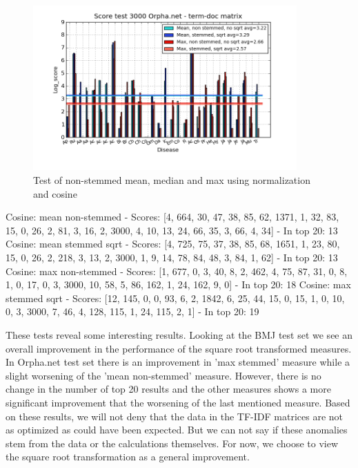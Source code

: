 \begin{figure}[h!]
        \begin{center}
          \includegraphics[width=0.9\textwidth]{barcharts/termDoc_orphan_hist_3000_ns_mea_ns_mea_sqr_s_max_s_max_sqr.png}
        \end{center}
        \caption{Test of non-stemmed mean, median and max using normalization and cosine}
        \label{termDoc_orphan_hist_3000_ns_mea_ns_mea_sqr_s_max_s_max_sqr}
\end{figure}

 
Cosine: mean non-stemmed - Scores: [4, 664, 30, 47, 38, 85, 62, 1371, 1, 32, 83, 15, 0, 26, 2, 81, 3, 16, 2, 3000, 4, 10, 13, 24, 66, 35, 3, 66, 4, 34] - In top 20: 13
Cosine: mean stemmed sqrt - Scores: [4, 725, 75, 37, 38, 85, 68, 1651, 1, 23, 80, 15, 0, 26, 2, 218, 3, 13, 2, 3000, 1, 9, 14, 78, 84, 48, 3, 84, 1, 62] - In top 20: 13
Cosine: max non-stemmed - Scores: [1, 677, 0, 3, 40, 8, 2, 462, 4, 75, 87, 31, 0, 8, 1, 0, 17, 0, 3, 3000, 10, 58, 5, 86, 162, 1, 24, 162, 9, 0] - In top 20: 18
Cosine: max stemmed sqrt - Scores: [12, 145, 0, 0, 93, 6, 2, 1842, 6, 25, 44, 15, 0, 15, 1, 0, 10, 0, 3, 3000, 7, 46, 4, 128, 115, 1, 24, 115, 2, 1] - In top 20: 19

These tests reveal some interesting results. Looking at the BMJ test set we see an overall improvement in the performance of the square root transformed measures. In Orpha.net test set there is an improvement in 'max stemmed' measure while a slight worsening of the 'mean non-stemmed' measure. However, there is no change in the number of top 20 results and the other measures shows a more significant improvement that the worsening of the last mentioned measure. Based on these results, we will not deny that the data in the TF-IDF matrices are not as optimized as could have been expected. But we can not say if these anomalies stem from the data or the calculations themselves. For now, we choose to view the square root transformation as a general improvement.


